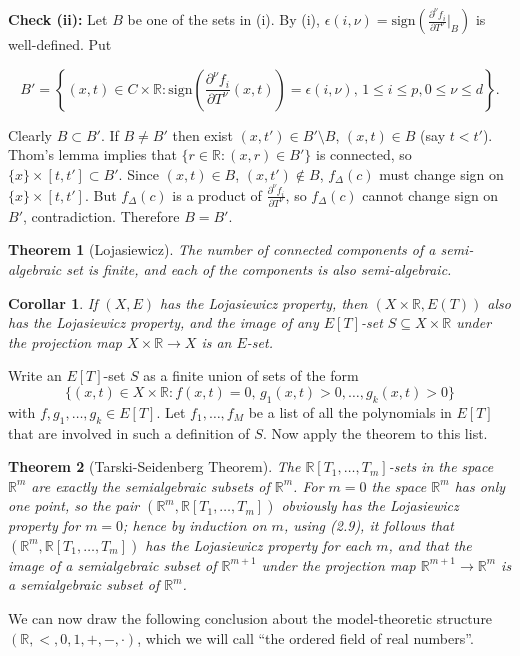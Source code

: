 \documentclass[12pt]{article}
\theoremstyle{mythm}
\let\oldendproof\endproof
\renewenvironment{proof}[1][\proofname]{%
  \oldproof[\normalfont \bfseries \sffamily #1]%
}{\oldendproof}
\newtheorem{thm}{Theorem}[section]
\renewcommand*{\proofname}{Proof}
\renewcommand*{\proofname}{Proof}
\newtheorem{cor}{Corollar}[section]
\renewcommand*{\proofname}{Proof}
\renewcommand*{\proofname}{Proof}
\renewcommand*{\proofname}{Proof}
\renewcommand*{\proofname}{Proof}
\renewcommand*{\proofname}{Proof}
\newcommand{\R}{\mathbb{R}}
\newcommand{\RR}{\mathbb{R}}
\begin{document}
\begin{proof}
\textbf{Check (ii):} Let \( B \) be one of the sets in (i). By (i), \( \epsilon(i, \nu) = \text{sign}(\frac{\partial^\nu f_i}{\partial T^\nu} |_B) \) is well-defined. Put

\[
B' = \left\{(x, t) \in C \times \mathbb{R}: \text{sign}\left(\frac{\partial^\nu f_i}{\partial T^\nu}(x, t)\right) = \epsilon(i, \nu), \, 1 \leq i \leq p, 0 \leq \nu \leq d\right\}.
\]

Clearly \( B \subset B' \). If \( B \neq B' \) then exist \((x, t') \in B' \setminus B\), \((x, t) \in B\) (say \( t < t'\)). Thom's lemma implies that \(\{r \in \mathbb{R} : (x, r) \in B'\}\) is connected, so \(\{x\} \times [t, t'] \subset B'\). Since \((x, t) \in B\), \((x, t') \notin B\), \(f_\Delta(c)\) must change sign on \(\{x\} \times [t, t']\). But \(f_\Delta(c)\) is a product of \(\frac{\partial^\nu f_i}{\partial T^\nu}\), so \(f_\Delta(c)\) cannot change sign on \(B'\), contradiction. Therefore \(B = B'\).




\end{proof}

\begin{thm}[Lojasiewicz]
The number of connected components of a semi-algebraic set is finite,
and each of the components is also semi-algebraic.
\end{thm}


\begin{cor}
     If $(X, E)$ has the Lojasiewicz property, then $(X \times \mathbb{R}, E(T))$ also has the Lojasiewicz property, and the image of any $E[T]$-set $S \subseteq X \times \mathbb{R}$ under the projection map $X \times \mathbb{R} \to X$ is an $E$-set.
\end{cor}

\begin{proof}
 
Write an \( E[T] \)-set \( S \) as a finite union of sets of the form
\[
\{(x,t) \in X \times \mathbb{R} : f(x,t) = 0, \, g_1(x,t) > 0, \ldots, g_k(x,t) > 0\}
\]
with \( f, g_1, \ldots, g_k \in E[T] \). Let \( f_1, \ldots, f_M \) be a list of all the polynomials in \( E[T] \) that are involved in such a definition of \( S \). Now apply the theorem to this list.
\end{proof}




\begin{thm}[Tarski-Seidenberg Theorem]
    The $\R[T_1, \ldots, T_m]$-sets in the space $\R^m$ are exactly the semialgebraic subsets of $\R^m$. For $m = 0$ the space $\RR^m$ has only one point, so the pair $(\RR^m, \RR[T_1, \ldots, T_m])$ obviously has the Lojasiewicz property for $m = 0$; hence by induction on $m$, using (2.9), it follows that $(\RR^m, \RR[T_1, \ldots, T_m])$ has the Lojasiewicz property for each $m$, and that the image of a semialgebraic subset of $\RR^{m+1}$ under the projection map $\RR^{m+1} \to \RR^m$ is a semialgebraic subset of $\RR^m$.
\end{thm}
We can now draw the following conclusion about the model-theoretic structure $(\R, <, 0, 1, +, -, \cdot)$, which we will call ``the ordered field of real numbers''.
\end{document}
